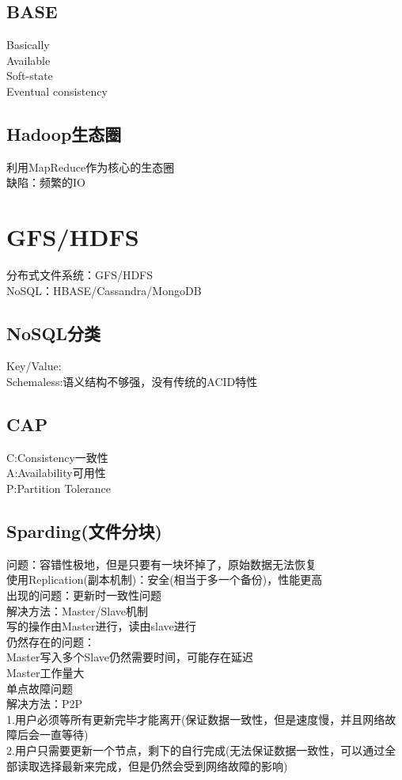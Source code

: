 \documentclass{article}
\begin{document}
\begin{CJK}{UTF8}{gbsn}
	
	\subsection*{BASE}
	Basically\\
	Available\\
	Soft-state\\
	Eventual consistency\\
	
	\subsection*{Hadoop生态圈}
	利用MapReduce作为核心的生态圈\\
	缺陷：频繁的IO\\
	
	
	\section*{GFS/HDFS}
	分布式文件系统：GFS/HDFS\\
	NoSQL：HBASE/Cassandra/MongoDB\\
	\subsection*{NoSQL分类}
	Key/Value:\\
	Schemaless:语义结构不够强，没有传统的ACID特性\\
	
	\subsection*{CAP}
	C:Consistency一致性\\
	A:Availability可用性\\
	P:Partition Tolerance\\
	\subsection*{Sparding(文件分块)}
	问题：容错性极地，但是只要有一块坏掉了，原始数据无法恢复\\
	使用Replication(副本机制)：安全(相当于多一个备份)，性能更高\\
	出现的问题：更新时一致性问题\\
	解决方法：Master/Slave机制\\
	写的操作由Master进行，读由slave进行\\
	仍然存在的问题：\\
	Master写入多个Slave仍然需要时间，可能存在延迟\\
	Master工作量大\\
	单点故障问题\\
	解决方法：P2P\\
	1.用户必须等所有更新完毕才能离开(保证数据一致性，但是速度慢，并且网络故障后会一直等待)\\
	2.用户只需要更新一个节点，剩下的自行完成(无法保证数据一致性，可以通过全部读取选择最新来完成，但是仍然会受到网络故障的影响)\\
	

\end{CJK}
\end{document}
